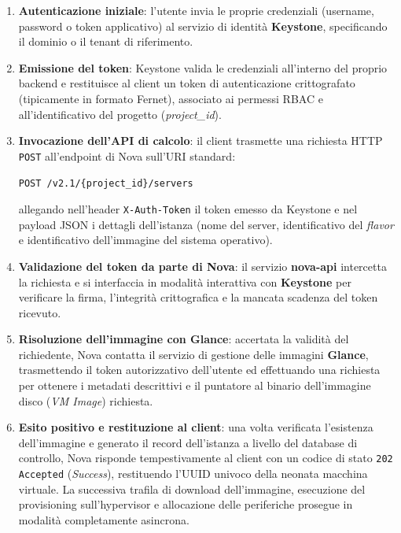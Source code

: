 \documentclass[11pt, a4paper]{article}
\begin{document}
\begin{enumerate}
    \item \textbf{Autenticazione iniziale}: l'utente invia le proprie credenziali (username, password o token applicativo) al servizio di identità \textbf{Keystone}, specificando il dominio o il tenant di riferimento.
    \item \textbf{Emissione del token}: Keystone valida le credenziali all'interno del proprio backend e restituisce al client un token di autenticazione crittografato (tipicamente in formato Fernet), associato ai permessi RBAC e all'identificativo del progetto (\emph{project\_id}).
    \item \textbf{Invocazione dell'API di calcolo}: il client trasmette una richiesta HTTP \texttt{POST} all'endpoint di Nova sull'URI standard:
    \begin{center}
        \texttt{POST /v2.1/\{project\_id\}/servers}
    \end{center}
    allegando nell'header \texttt{X-Auth-Token} il token emesso da Keystone e nel payload JSON i dettagli dell'istanza (nome del server, identificativo del \emph{flavor} e identificativo dell'immagine del sistema operativo).
    \item \textbf{Validazione del token da parte di Nova}: il servizio \textbf{nova-api} intercetta la richiesta e si interfaccia in modalità interattiva con \textbf{Keystone} per verificare la firma, l'integrità crittografica e la mancata scadenza del token ricevuto.
    \item \textbf{Risoluzione dell'immagine con Glance}: accertata la validità del richiedente, Nova contatta il servizio di gestione delle immagini \textbf{Glance}, trasmettendo il token autorizzativo dell'utente ed effettuando una richiesta per ottenere i metadati descrittivi e il puntatore al binario dell'immagine disco (\emph{VM Image}) richiesta.
    \item \textbf{Esito positivo e restituzione al client}: una volta verificata l'esistenza dell'immagine e generato il record dell'istanza a livello del database di controllo, Nova risponde tempestivamente al client con un codice di stato \texttt{202 Accepted} (\emph{Success}), restituendo l'UUID univoco della neonata macchina virtuale. La successiva trafila di download dell'immagine, esecuzione del provisioning sull'hypervisor e allocazione delle periferiche prosegue in modalità completamente asincrona.
\end{enumerate}

\newpage
\end{document}

